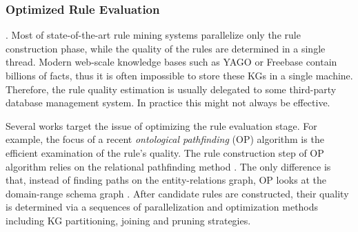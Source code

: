 \subsubsection{Optimized Rule Evaluation}
.
Most of state-of-the-art rule mining systems parallelize only the rule construction phase, while the quality of the rules are determined in a single thread. Modern web-scale knowledge bases such as YAGO or Freebase %
contain %
billions of facts, thus  
it is often impossible to store these KGs in a single machine. Therefore, %
the rule quality estimation %
is usually delegated to some third-party database management system.
In practice this might not always be effective. %

Several works target the issue of optimizing the rule evaluation stage. For example, the focus of a recent %
 \emph{ontological pathfinding} (OP) \cite{op} algorithm is %
the efficient examination of the rule's quality. The rule construction step of OP algorithm relies on the relational pathfinding method \cite{DBLP:conf/aaai/RichardsM92}. The only difference is that, instead of finding paths on the entity-relations graph, OP looks at the domain-range schema graph \cite{op}. After candidate rules are constructed, their quality is determined via a sequences of parallelization and optimization methods including KG partitioning, joining and pruning strategies.




